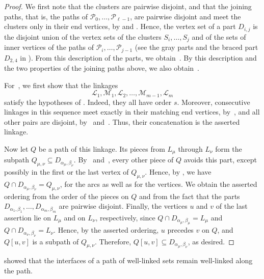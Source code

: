 \documentclass[fontsize=12pt,leading=14pt]{fullpaper}
\newcommand{\Lcal}{\mathcal{L}}
\newcommand{\Mcal}{\mathcal{M}}
\newcommand{\Pcal}{\mathcal{P}}
\begin{document}
\begin{proof}
  We first note that the clusters are pairwise disjoint, and that the joining paths, that is, the paths of $\Pcal_0,\dots,\Pcal_{\ell-1}$, are pairwise disjoint and meet the clusters only in their end vertices, by  and .
  Hence, the vertex set of a part $D_{i,j}$ is the disjoint union of the vertex sets of the clusters $S_i,\dots,S_j$ and of the sets of inner vertices of the paths of $\Pcal_i,\dots,\Pcal_{j-1}$ (see the gray parts and the braced part $D_{2,4}$ in ).
  From this description of the parts, we obtain~.
  By this description and the two properties of the joining paths above, we also obtain~.

  For~, we first show that the linkages
  \[
    \Lcal_1,\Mcal_1,\Lcal_2,\dots,\Mcal_{m-1},\Lcal_m
  \]
  satisfy the hypotheses of .
  Indeed, they all have order $s$.
  Moreover, consecutive linkages in this sequence meet exactly in their matching end vertices, by~, and all other pairs are disjoint, by~ and~.
  Thus, their concatenation is the asserted linkage.

  Now let $Q$ be a path of this linkage.
  Its pieces from $L_\mu$ through $L_\nu$ form the subpath $Q_{\mu,\nu}\subseteq D_{\alpha_\mu,\beta_\nu}$.
  By~ and~, every other piece of $Q$ avoids this part, except possibly in the first or the last vertex of $Q_{\mu,\nu}$.
  Hence, by , we have $Q\cap D_{\alpha_\mu,\beta_\nu}=Q_{\mu,\nu}$, for the arcs as well as for the vertices.
  We obtain the asserted ordering from the order of the pieces on $Q$ and from the fact that the parts $D_{\alpha_1,\beta_1},\dots,D_{\alpha_m,\beta_m}$ are pairwise disjoint.
  Finally, the vertices $u$ and $v$ of the last assertion lie on $L_\mu$ and on $L_\nu$, respectively, since $Q\cap D_{\alpha_\mu,\beta_\mu}=L_\mu$ and $Q\cap D_{\alpha_\nu,\beta_\nu}=L_\nu$.
  Hence, by the asserted ordering, $u$ precedes $v$ on $Q$, and $Q[u,v]$ is a subpath of $Q_{\mu,\nu}$.
  Therefore, $Q[u,v]\subseteq D_{\alpha_\mu,\beta_\nu}$, as desired.
\end{proof}

\textcite{HKMM26a} showed that the interfaces of a path of well-linked sets remain well-linked along the path.
\end{document}
